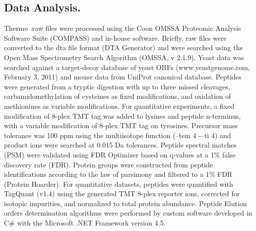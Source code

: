 \subsection*{Data Analysis.}
Thermo .raw files were processed using the Coon OMSSA Proteomic Analysis Software Suite (COMPASS) and in-house software.\cite{compass} Briefly, raw files were converted to the dta file format (DTA Generator) and were searched using the Open Mass Spectrometry Search Algorithm (OMSSA, v 2.1.9).\cite{omssa} Yeast data was searched against a target-decoy database of yeast ORFs (www.yeastgenome.com, February 3, 2011) and mouse data from UniProt canonical database.\cite{targetdecoy} Peptides were generated from a tryptic digestion with up to three missed cleavages, carbamidomethylation of cysteines as fixed modifications, and oxidation of methionines as variable modifications. For quantitative experiments, a fixed modification of 8-plex TMT tag was added to lysines and peptide n-terminus, with a variable modification of 8-plex TMT tag on tyrosines. Precursor mass tolerance was 100 ppm using the multiisotope function (--tem 4 -–ti 4) and product ions were searched at 0.015 Da tolerances. Peptide spectral matches (PSM) were validated using FDR Optimizer based on q-values at a 1\% false discovery rate (FDR). Protein groups were constructed from peptide identifications according to the law of parsimony and filtered to a 1\% FDR (Protein Hoarder). For quantitative datasets, peptides were quantified with TagQuant (v1.4) using the generated TMT 8-plex reporter ions, corrected for isotopic impurities, and normalized to total protein abundance. Peptide Elution orders determination algorithms were performed by custom software developed in C\# with the Microsoft .NET Framework version 4.5. 


